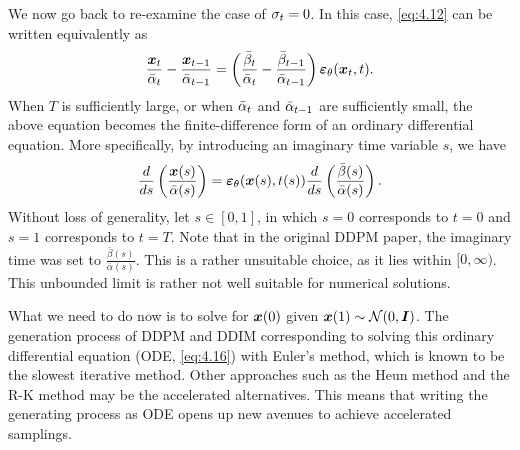 We now go back to re-examine the case of $\sigma_t=0$. In this case, \cref{eq:4.12} can be written equivalently as
\begin{equation}
    \label{eq:4.16}
    \frac{\bm{x}_{t}}{\bar{\alpha}_t}-\frac{\bm{x}_{t-1}}{\bar{\alpha}_{t-1}}=\left(\frac{\bar{\beta}_t}{\bar{\alpha}_t}-\frac{\bar{\beta}_{t-1}}{\bar{\alpha}_{t-1}}\right)\bm{\varepsilon}_\theta(\bm{x}_{t},t).
\end{equation}
When $T$ is sufficiently large, or when $\bar{\alpha}_t$ and $\bar{\alpha}_{t-1}$ are sufficiently small, the above equation becomes the finite-difference form of an ordinary differential equation. More specifically, by introducing an imaginary time variable $s$, we have
\begin{equation}
    \label{eq:4.17}
    \frac{d}{ds}\left( \frac{\bm{x}(s)}{\bar{\alpha}(s)}\right)=\bm{\varepsilon}_\theta(\bm{x}(s),t(s))\frac{d}{ds}\left(\frac{\bar{\beta}(s)}{\bar{\alpha}(s)} \right).
\end{equation}
Without loss of generality, let $s\in[0,1]$, in which $s=0$ corresponds to $t=0$ and $s=1$ corresponds to $t=T$. Note that in the original DDPM paper, the imaginary time was set to $\frac{\bar{\beta}(s)}{\bar{\alpha}(s)}$. This is a rather unsuitable choice, as it lies within $[0,\infty)$. This unbounded limit is rather not well suitable for numerical solutions. 

What we need to do now is to solve for $\bm{x}(0)$ given $\bm{x}(1)\sim\mathcal{N}(0,\bm{I})$. The generation process of DDPM and DDIM corresponding to solving this ordinary differential equation (ODE, \cref{eq:4.16}) with Euler's method, which is known to be the slowest iterative method. Other approaches such as the Heun method and the R-K method may be the accelerated alternatives. This means that writing the generating process as ODE opens up new avenues to achieve accelerated samplings. 

